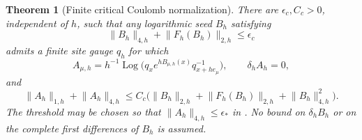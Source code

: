 \documentclass[11pt]{article}
\numberwithin{equation}{section}
\newtheorem{theorem}{Theorem}[section]
\theoremstyle{definition}
\theoremstyle{remark}
\newcommand{\norm}[1]{\lVert#1\rVert}
\begin{document}
\begin{theorem}[Finite critical Coulomb normalization]
\label{thm:finite-Coulomb-normalization}
There are $\epsilon_c,C_c>0$, independent of $h$, such that any logarithmic
seed $B_h$ satisfying
\begin{equation}
 \norm{B_h}_{4,h}+\norm{F_h(B_h)}_{2,h}\le\epsilon_c
 \label{eq:native-critical-seed}
\end{equation}
admits a finite site gauge $q_h$ for which
\begin{equation}
 A_{\mu,h}=h^{-1}\operatorname{Log}
 \bigl(q_xe^{hB_{\mu,h}(x)}q_{x+h e_\mu}^{-1}\bigr),
 \qquad \delta_hA_h=0,
 \label{eq:native-constructed-Coulomb}
\end{equation}
and
\begin{equation}
 \norm{A_h}_{1,h}+\norm{A_h}_{4,h}
 \le C_c\bigl(\norm{B_h}_{2,h}+\norm{F_h(B_h)}_{2,h}
                 +\norm{B_h}_{4,h}^2\bigr).
 \label{eq:native-Coulomb-estimate}
\end{equation}
The threshold may be chosen so that $\norm{A_h}_{4,h}\le\epsilon_*$ in
.  No bound on $\delta_hB_h$ or on the
complete first differences of $B_h$ is assumed.
\end{theorem}
\end{document}

